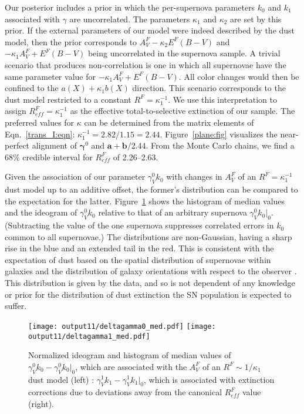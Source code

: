 \documentclass{aastex61}   	%
\begin{document}
Our posterior
includes a prior in which the per-supernova parameters $k_0$ and  $k_1$ associated with $\gamma$ are uncorrelated.
The parameters $\kappa_1$ and $\kappa_2$ are set by this prior.
If the external parameters of our model were indeed described by the   dust model, then the prior corresponds
to    $A^F_V - \kappa_2 E^F(B-V)$ and $-\kappa_1 A^F_V + E^F(B-V)$ being uncorrelated in the supernova sample.
A trivial scenario that produces non-correlation is one in which all supernovae have the same parameter value for $-\kappa_1 A^F_V + E^F(B-V)$.
All color changes would then be confined to the $a(X)+\kappa_1 b(X)$ direction. This scenario corresponds to the   dust model restricted to a constant $R^F=\kappa_1^{-1}$.   We use this interpretation to assign  $R^F_{eff} = \kappa_1^{-1}$ as
the effective total-to-selective extinction of our sample.
The preferred values for $\kappa$ can be determined from the matrix elements of Eqn.~\ref{trans_I:eqn}: $\kappa^{-1}_1=2.82/1.15 =2.44$.
Figure~\ref{plane:fig} visualizes the near-perfect alignment of $\pmb{\gamma}^0$ and  $\mathbf{a}+\mathbf{b}/2.44$.
From the Monte Carlo chains, we find a 68\% credible interval for  $R^F_{eff}$ of 2.26--2.63.


Given the association of  our parameter $\gamma^0_V k_0$ with changes in $A^F_V$ of an $R^F =\kappa^{-1}_1$ dust model up to an additive offset,
the former's distribution can be compared to the expectation for the latter.
Figure~\ref{k0_med:fig} shows the histogram of
median values and the ideogram of $\gamma^0_V k_0$ 
relative to that of an arbitrary supernova  $\gamma^0_V k_0|_0$.
(Subtracting the value of the one supernova suppresses correlated errors in $k_0$ common to all supernovae.)
The distributions are non-Gaussian, having a sharp rise in the blue and an extended tail in the red.  This is consistent
with the expectation of dust based on the spatial distribution of supernovae within galaxies and the distribution of galaxy orientations with respect to the observer \citep{1998ApJ...502..177H}.  This distribution is given by the data, and so is not dependent of any knowledge or prior
for the distribution of dust extinction the SN population is expected to suffer. 


\begin{figure}[htbp] %
   \centering
   \texttt{[image: output11/deltagamma0\_med.pdf]}
   \texttt{[image: output11/deltagamma1\_med.pdf]}
      \caption{
      Normalized ideogram and histogram 
      of
median values of $\gamma^0_V k_0-\gamma^0_V k_0|_0$, which are associated with the $A^F_V$ of an $R^F \sim 1/\kappa_1$ dust model
(left) : $\gamma^1_V k_1-\gamma^1_V k_1|_0$,
which  is associated with extinction corrections due to deviations away from the canonical $R^F_{eff}$ value (right).
   \label{k0_med:fig}}
\end{figure}
\end{document}
